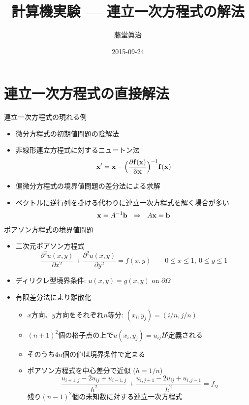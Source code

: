\documentclass[dvipdfmx]{beamer}
\title{計算機実験 --- 連立一次方程式の解法}
\author{藤堂眞治}
\date{2015-09-24}
\begin{document}

\begin{frame}
  \titlepage
  \tableofcontents
\end{frame}

\section{連立一次方程式の直接解法}

\begin{frame}[t,fragile]{連立一次方程式の現れる例}
  \begin{itemize}
    \setlength{\itemsep}{1em}
  \item 微分方程式の初期値問題の陰解法
  \item 非線形連立方程式に対するニュートン法
    \[ {\bf x}' = {\bf x} - \Big( \frac{\partial {\bf f}({\bf x})}{\partial {\bf x}} \Big)^{-1} {\bf f}({\bf x}) \]
  \item 偏微分方程式の境界値問題の差分法による求解
  \item ベクトルに逆行列を掛ける代わりに連立一次方程式を解く場合が多い
    \[ {\bf x} = A^{-1} {\bf b} \ \ \Rightarrow \ \ A {\bf x} = {\bf b} \]
  \end{itemize}
\end{frame}

\begin{frame}[t,fragile]{ポアソン方程式の境界値問題}
  \begin{itemize}
    \setlength{\itemsep}{1em}
  \item 二次元ポアソン方程式
    \[ \frac{\partial^2 u(x,y)}{\partial x^2} + \frac{\partial^2 u(x,y)}{\partial y^2} = f(x,y) \qquad 0 \le x \le 1, \ 0 \le y \le 1\]
  \item ディリクレ型境界条件: $u(x,y) = g(x,y)$ on $\partial \Omega$
  \item 有限差分法により離散化
    \begin{itemize}
    \item $x$方向、$y$方向をそれぞれ$n$等分: $(x_i,y_j) = (i/n, j/n)$
    \item $(n+1)^2$個の格子点の上で$u(x_i,y_j)=u_{ij}$が定義される
    \item そのうち$4n$個の値は境界条件で定まる
    \item ポアソン方程式を中心差分で近似 ($h=1/n$)
      \[
      \frac{u_{i+1,j}-2u_{ij}+u_{i-1,j}}{h^2} + \frac{u_{i,j+1}-2u_{ij}+u_{i,j-1}}{h^2} = f_{ij}
      \]
      残り$(n-1)^2$個の未知数に対する連立一次方程式
    \end{itemize}
  \end{itemize}
\end{frame}
\end{document}
